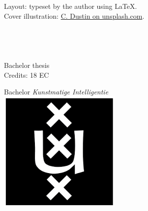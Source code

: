     \restoregeometry

\newpage

\thispagestyle{empty}

\vspace*{0.8\textheight}
\noindent
Layout: typeset by the author using \LaTeX. \\
Cover illustration: \href{https://unsplash.com/@dianamia}{C. Dustin on
unsplash.com}.
\restoregeometry

\newpage
\thispagestyle{empty}

\begin{center}

\vspace{2.5cm}


\begin{Huge}
\theTitle
\end{Huge} \\

\vspace{0.5 cm}

\begin{Large}
\theSubTitle
\end{Large}

\vspace{1.5cm}

\theAuthor\\
\theStudentID

\vspace{1.5cm}

Bachelor thesis\\
Credits: 18 EC

\vspace{0.5cm}

Bachelor \textit{Kunstmatige Intelligentie} \\
\vspace{0.25cm}
\includegraphics[width=0.075\paperwidth]{fig/uva_logo} \\
\vspace{0.1cm}


\end{center}
